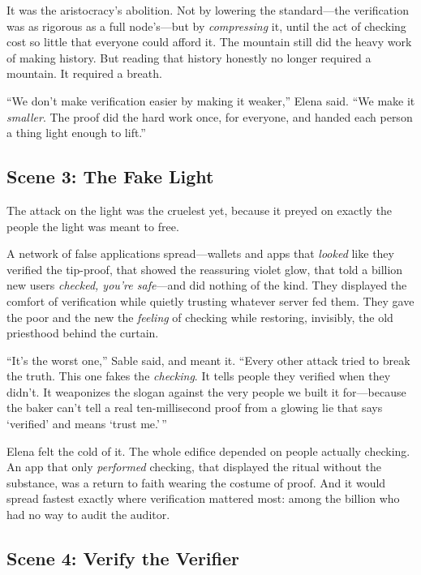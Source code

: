 \documentclass[12pt,letterpaper]{book}
\begin{document}
It was the aristocracy's abolition. Not by lowering the standard---the verification
was as rigorous as a full node's---but by \emph{compressing} it, until the act of
checking cost so little that everyone could afford it. The mountain still did the
heavy work of making history. But reading that history honestly no longer required a
mountain. It required a breath.

``We don't make verification easier by making it weaker,'' Elena said. ``We make it
\emph{smaller}. The proof did the hard work once, for everyone, and handed each
person a thing light enough to lift.''

\hypertarget{scene-3-the-fake-light}{%
\subsection{Scene 3: The Fake
Light}\label{scene-3-the-fake-light}}

The attack on the light was the cruelest yet, because it preyed on exactly the people
the light was meant to free.

A network of false applications spread---wallets and apps that \emph{looked} like
they verified the tip-proof, that showed the reassuring violet glow, that told a
billion new users \emph{checked, you're safe}---and did nothing of the kind. They
displayed the comfort of verification while quietly trusting whatever server fed
them. They gave the poor and the new the \emph{feeling} of checking while restoring,
invisibly, the old priesthood behind the curtain.

``It's the worst one,'' Sable said, and meant it. ``Every other attack tried to break
the truth. This one fakes the \emph{checking}. It tells people they verified when they
didn't. It weaponizes the slogan against the very people we built it for---because the
baker can't tell a real ten-millisecond proof from a glowing lie that says `verified'
and means `trust me.'\,''

Elena felt the cold of it. The whole edifice depended on people actually checking.
An app that only \emph{performed} checking, that displayed the ritual without the
substance, was a return to faith wearing the costume of proof. And it would spread
fastest exactly where verification mattered most: among the billion who had no way to
audit the auditor.

\hypertarget{scene-4-verify-the-verifier}{%
\subsection{Scene 4: Verify the
Verifier}\label{scene-4-verify-the-verifier}}
\end{document}
